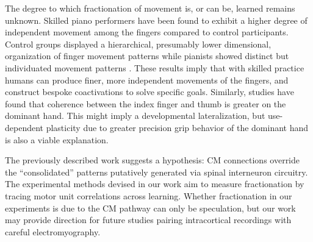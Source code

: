 \documentclass[../main.tex]{subfiles}
\begin{document}
The degree to which fractionation of movement is, or can be, learned remains unknown. Skilled piano performers have been found to exhibit a higher degree of independent movement among the fingers compared to control participants. Control groups displayed a hierarchical, presumably lower dimensional, organization of finger movement patterns while pianists showed distinct but individuated movement patterns \cite{furuyaFlexibilityMovementOrganization2013}. These results imply that with skilled practice humans can produce finer, more independent movements of the fingers, and construct bespoke coactivations to solve specific goals. Similarly, studies have found that coherence between the index finger and thumb is greater on the dominant hand. This might imply a developmental lateralization, but use-dependent plasticity due to greater precision grip behavior of the dominant hand is also a viable explanation\cite{fuglevandMechanicalPropertiesNeural2011}.

The previously described work suggests a hypothesis: CM connections override the ``consolidated'' patterns putatively generated via spinal interneuron circuitry. The experimental methods devised in our work aim to measure fractionation by tracing motor unit correlations across learning. Whether fractionation in our experiments is due to the CM pathway can only be speculation, but our work may provide direction for future studies pairing intracortical recordings with careful electromyography.




\end{document}
